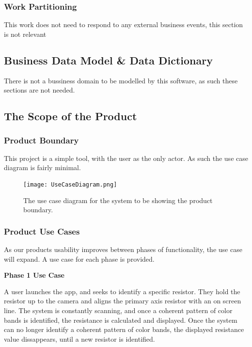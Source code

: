 \documentclass{article}
\begin{document}
\subsubsection{Work Partitioning}

This work does not need to respond to any external business events, this section is not relevant

\subsection{Business Data Model \& Data Dictionary}

There is not a bussiness domain to be modelled by this software, as such these sections are not needed.

\subsection{The Scope of the Product}

\subsubsection{Product Boundary}
This project is a simple tool, with the user as the only actor.
As such the use case diagram is fairly minimal.

\begin{figure}[H]
    \texttt{[image: UseCaseDiagram.png]}
	\caption{The use case diagram for the system to be showing the product boundary.}
    \label{fig:use_case_diagram}
\end{figure}



\subsubsection{Product Use Cases}

As our products usability improves between phases of functionality, the use case will expand.
A use case for each phase is provided.

\textbf{ Phase 1 Use Case}

A user launches the app, and seeks to identify a specific resistor.
They hold the resistor up to the camera and aligns the primary axis resistor with an on screen line.
The system is constantly scanning, and once a coherent pattern of color bands is identified, the resistance is calculated and displayed.
Once the system can no longer identify a coherent pattern of color bands, the displayed resistance value dissappears, until a new resistor is identified.
\end{document}
